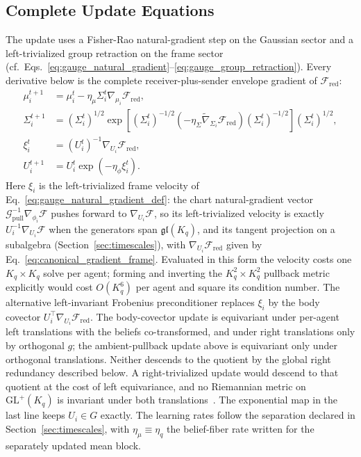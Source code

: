 \subsection*{Complete Update Equations}

The update uses a Fisher-Rao natural-gradient step on the Gaussian sector and a left-trivialized group retraction on the frame sector (cf.\ Eqs.~\eqref{eq:gauge_natural_gradient}--\eqref{eq:gauge_group_retraction}). Every derivative below is the complete receiver-plus-sender envelope gradient of $\mathcal{F}_{\mathrm{red}}$:
\begin{align}
\mu_i^{t+1} &= \mu_i^t - \eta_\mu \Sigma_i^t \nabla_{\mu_i} \mathcal{F}_{\mathrm{red}}, \\
\Sigma_i^{t+1} &= \left(\Sigma_i^t\right)^{1/2} \exp\left[\left(\Sigma_i^t\right)^{-1/2}\left(-\eta_\Sigma \tilde{\nabla}_{\Sigma_i} \mathcal{F}_{\mathrm{red}}\right)\left(\Sigma_i^t\right)^{-1/2}\right] \left(\Sigma_i^t\right)^{1/2}, \\
\xi_i^t &= \left(U_i^t\right)^{-1}\nabla_{U_i} \mathcal{F}_{\mathrm{red}}, \\
U_i^{t+1} &= U_i^t \exp\left(-\eta_\phi \xi_i^t\right).
\end{align}
Here $\xi_i$ is the left-trivialized frame velocity of Eq.~\eqref{eq:gauge_natural_gradient_def}: the chart natural-gradient vector $\mathcal{G}_{\mathrm{pull}}^{-1}\nabla_{\phi_i}\mathcal{F}$ pushes forward to $\nabla_{U_i}\mathcal{F}$, so its left-trivialized velocity is exactly $U_i^{-1}\nabla_{U_i}\mathcal{F}$ when the generators span $\mathfrak{gl}(K_q)$, and its tangent projection on a subalgebra (Section~\ref{sec:timescales}), with $\nabla_{U_i}\mathcal{F}_{\mathrm{red}}$ given by Eq.~\eqref{eq:canonical_gradient_frame}. Evaluated in this form the velocity costs one $K_q \times K_q$ solve per agent; forming and inverting the $K_q^2 \times K_q^2$ pullback metric explicitly would cost $O(K_q^6)$ per agent and square its condition number. The alternative left-invariant Frobenius preconditioner replaces $\xi_i$ by the body covector $U_i^\top\nabla_{U_i}\mathcal{F}_{\mathrm{red}}$. The body-covector update is equivariant under per-agent left translations with the beliefs co-transformed, and under right translations only by orthogonal $g$; the ambient-pullback update above is equivariant only under orthogonal translations. Neither descends to the quotient by the global right redundancy described below. A right-trivialized update would descend to that quotient at the cost of left equivariance, and no Riemannian metric on $\mathrm{GL}^+(K_q)$ is invariant under both translations~\cite{Milnor1976}. The exponential map in the last line keeps $U_i \in G$ exactly. The learning rates follow the separation declared in Section~\ref{sec:timescales}, with $\eta_\mu \equiv \eta_q$ the belief-fiber rate written for the separately updated mean block.

